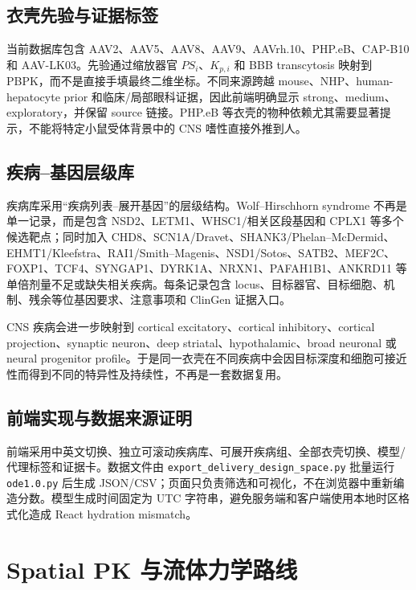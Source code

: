 \documentclass[UTF8,11pt,a4paper]{ctexart}
\newcommand{\code}[1]{\texttt{#1}}
\begin{document}
\subsection{衣壳先验与证据标签}
当前数据库包含 AAV2、AAV5、AAV8、AAV9、AAVrh.10、PHP.eB、CAP-B10 和 AAV-LK03。先验通过缩放器官 $PS_i$、$K_{p,i}$ 和 BBB transcytosis 映射到 PBPK，而不是直接手填最终二维坐标。不同来源跨越 mouse、NHP、human-hepatocyte prior 和临床/局部眼科证据，因此前端明确显示 strong、medium、exploratory，并保留 source 链接。PHP.eB 等衣壳的物种依赖尤其需要显著提示，不能将特定小鼠受体背景中的 CNS 嗜性直接外推到人。

\subsection{疾病--基因层级库}
疾病库采用“疾病列表--展开基因”的层级结构。Wolf--Hirschhorn syndrome 不再是单一记录，而是包含 NSD2、LETM1、WHSC1/相关区段基因和 CPLX1 等多个候选靶点；同时加入 CHD8、SCN1A/Dravet、SHANK3/Phelan--McDermid、EHMT1/Kleefstra、RAI1/Smith--Magenis、NSD1/Sotos、SATB2、MEF2C、FOXP1、TCF4、SYNGAP1、DYRK1A、NRXN1、PAFAH1B1、ANKRD11 等单倍剂量不足或缺失相关疾病。每条记录包含 locus、目标器官、目标细胞、机制、残余等位基因要求、注意事项和 ClinGen 证据入口。

CNS 疾病会进一步映射到 cortical excitatory、cortical inhibitory、cortical projection、synaptic neuron、deep striatal、hypothalamic、broad neuronal 或 neural progenitor profile。于是同一衣壳在不同疾病中会因目标深度和细胞可接近性而得到不同的特异性及持续性，不再是一套数据复用。

\subsection{前端实现与数据来源证明}
前端采用中英文切换、独立可滚动疾病库、可展开疾病组、全部衣壳切换、模型/代理标签和证据卡。数据文件由 \code{export\_delivery\_design\_space.py} 批量运行 \code{ode1.0.py} 后生成 JSON/CSV；页面只负责筛选和可视化，不在浏览器中重新编造分数。模型生成时间固定为 UTC 字符串，避免服务端和客户端使用本地时区格式化造成 React hydration mismatch。

\section{Spatial PK 与流体力学路线}
\end{document}
